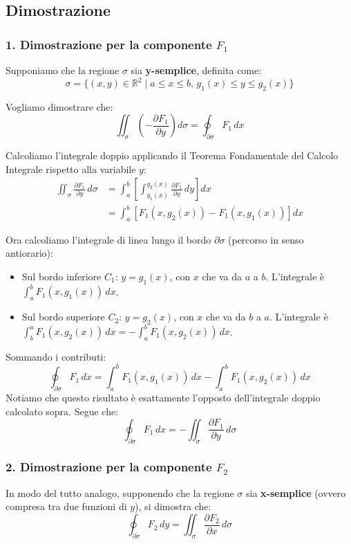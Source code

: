 \subsection{Dimostrazione}
\subsubsection*{1. Dimostrazione per la componente $F_1$}
Supponiamo che la regione $\sigma$ sia \textbf{y-semplice}, definita come:
\[ \sigma = \{ (x, y) \in \mathbb{R}^2 \mid a \le x \le b, \, g_1(x) \le y \le g_2(x) \} \]

Vogliamo dimostrare che:
\[ \iint_{\sigma} \left( -\frac{\partial F_1}{\partial y} \right) d\sigma = \oint_{\partial \sigma} F_1 \, dx \]

Calcoliamo l'integrale doppio applicando il Teorema Fondamentale del Calcolo Integrale rispetto alla variabile $y$:
\begin{align*}
\iint_{\sigma} \frac{\partial F_1}{\partial y} \, d\sigma &= \int_a^b \left[ \int_{g_1(x)}^{g_2(x)} \frac{\partial F_1}{\partial y} \, dy \right] dx \\
&= \int_a^b \left[ F_1(x, g_2(x)) - F_1(x, g_1(x)) \right] dx
\end{align*}

Ora calcoliamo l'integrale di linea lungo il bordo $\partial \sigma$ (percorso in senso antiorario):
\begin{itemize}
    \item Sul bordo inferiore $C_1$: $y = g_1(x)$, con $x$ che va da $a$ a $b$. L'integrale è $\int_a^b F_1(x, g_1(x)) \, dx$.
    \item Sul bordo superiore $C_2$: $y = g_2(x)$, con $x$ che va da $b$ a $a$. L'integrale è $\int_b^a F_1(x, g_2(x)) \, dx = -\int_a^b F_1(x, g_2(x)) \, dx$.
\end{itemize}

Sommando i contributi:
\[ \oint_{\partial \sigma} F_1 \, dx = \int_a^b F_1(x, g_1(x)) \, dx - \int_a^b F_1(x, g_2(x)) \, dx \]
Notiamo che questo risultato è esattamente l'opposto dell'integrale doppio calcolato sopra. Segue che:
\[ \oint_{\partial \sigma} F_1 \, dx = -\iint_{\sigma} \frac{\partial F_1}{\partial y} \, d\sigma \]

\subsubsection*{2. Dimostrazione per la componente $F_2$}

In modo del tutto analogo, supponendo che la regione $\sigma$ sia \textbf{x-semplice} (ovvero compresa tra due funzioni di $y$), si dimostra che:
\[ \oint_{\partial \sigma} F_2 \, dy = \iint_{\sigma} \frac{\partial F_2}{\partial x} \, d\sigma \]

